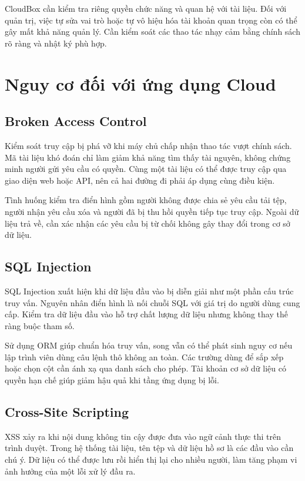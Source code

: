 CloudBox cần kiểm tra riêng quyền chức năng và quan hệ với tài liệu. Đối với quản trị, việc tự sửa vai trò hoặc tự vô hiệu hóa tài khoản quan trọng còn có thể gây mất khả năng quản lý. Cần kiểm soát các thao tác nhạy cảm bằng chính sách rõ ràng và nhật ký phù hợp.

\section{Nguy cơ đối với ứng dụng Cloud}
\subsection{Broken Access Control}
Kiểm soát truy cập bị phá vỡ khi máy chủ chấp nhận thao tác vượt chính sách. Mã tài liệu khó đoán chỉ làm giảm khả năng tìm thấy tài nguyên, không chứng minh người gửi yêu cầu có quyền. Cùng một tài liệu có thể được truy cập qua giao diện web hoặc API, nên cả hai đường đi phải áp dụng cùng điều kiện.

Tình huống kiểm tra điển hình gồm người không được chia sẻ yêu cầu tải tệp, người nhận yêu cầu xóa và người đã bị thu hồi quyền tiếp tục truy cập. Ngoài dữ liệu trả về, cần xác nhận các yêu cầu bị từ chối không gây thay đổi trong cơ sở dữ liệu.
\subsection{SQL Injection}
SQL Injection xuất hiện khi dữ liệu đầu vào bị diễn giải như một phần cấu trúc truy vấn. Nguyên nhân điển hình là nối chuỗi SQL với giá trị do người dùng cung cấp. Kiểm tra dữ liệu đầu vào hỗ trợ chất lượng dữ liệu nhưng không thay thế ràng buộc tham số.

Sử dụng ORM giúp chuẩn hóa truy vấn, song vẫn có thể phát sinh nguy cơ nếu lập trình viên dùng câu lệnh thô không an toàn. Các trường dùng để sắp xếp hoặc chọn cột cần ánh xạ qua danh sách cho phép. Tài khoản cơ sở dữ liệu có quyền hạn chế giúp giảm hậu quả khi tầng ứng dụng bị lỗi.
\subsection{Cross-Site Scripting}
XSS xảy ra khi nội dung không tin cậy được đưa vào ngữ cảnh thực thi trên trình duyệt. Trong hệ thống tài liệu, tên tệp và dữ liệu hồ sơ là các đầu vào cần chú ý. Dữ liệu có thể được lưu rồi hiển thị lại cho nhiều người, làm tăng phạm vi ảnh hưởng của một lỗi xử lý đầu ra.

